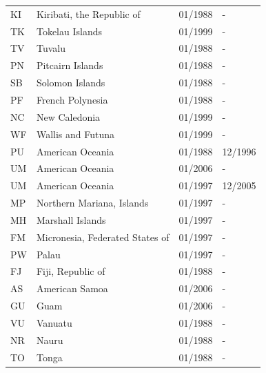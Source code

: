 \begin{footnotesize}
\begin{longtable}{lp{8cm}p{2cm}p{2cm}}
	KI & Kiribati, the Republic of       & 01/1988 & -  \\
	TK & Tokelau Islands                 & 01/1999 & -  \\
	TV & Tuvalu                          & 01/1988 & -  \\
	PN & Pitcairn Islands                & 01/1988 & -  \\
	SB & Solomon Islands                 & 01/1988 & -  \\
	PF & French Polynesia                & 01/1988 & -  \\
	NC & New Caledonia                   & 01/1999 & -  \\
	WF & Wallis and Futuna               & 01/1999 & -  \\
	PU & American Oceania                & 01/1988 & 12/1996  \\
	UM & American Oceania                & 01/2006 & -  \\
	UM & American Oceania                & 01/1997 & 12/2005  \\
	MP & Northern Mariana, Islands       & 01/1997 & -  \\
	MH & Marshall Islands                & 01/1997 & -  \\
	FM & Micronesia, Federated States of & 01/1997 & -  \\
	PW & Palau                           & 01/1997 & -  \\
	FJ & Fiji, Republic of               & 01/1988 & -  \\
	AS & American Samoa                  & 01/2006 & -  \\
	GU & Guam                            & 01/2006 & -  \\
	VU & Vanuatu                         & 01/1988 & -  \\
	NR & Nauru                           & 01/1988 & -  \\
	TO & Tonga                           & 01/1988 & -  \\
\end{longtable}
\end{footnotesize}

